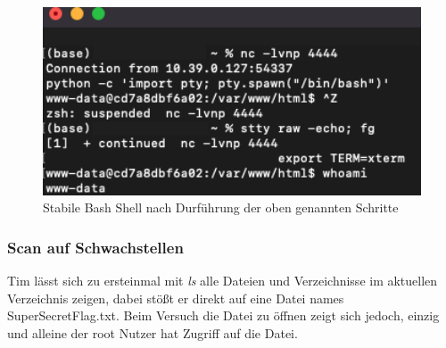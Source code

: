 \documentclass[10pt, a4paper,onecolumn ,titlepage]{article}
\begin{document}
    \begin{figure}[H]
        \centering
        \includegraphics[width=1\textwidth]{storyline_bilder_vm2/shellStabilisierenGanz}
        \caption{Stabile Bash Shell nach Durführung der oben genannten Schritte}
        \label{fig:shellStabilisiert}
    \end{figure}
    \noindent





    \subsubsection{Scan auf Schwachstellen}
    \label{subsubsec:scanSchwachstellen}
    Tim lässt sich zu ersteinmal mit \textit{ls} alle Dateien und Verzeichnisse im aktuellen Verzeichnis zeigen, dabei stößt er direkt auf eine Datei names SuperSecretFlag.txt.
    Beim Versuch die Datei zu öffnen zeigt sich jedoch, einzig und alleine der root Nutzer hat Zugriff auf die Datei.
\end{document}
